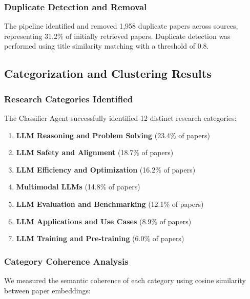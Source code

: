 \subsubsection{Duplicate Detection and Removal}

The pipeline identified and removed 1,958 duplicate papers across sources, representing 31.2\% of initially retrieved papers. Duplicate detection was performed using title similarity matching with a threshold of 0.8.

\subsection{Categorization and Clustering Results}

\subsubsection{Research Categories Identified}

The Classifier Agent successfully identified 12 distinct research categories:

\begin{enumerate}
    \item \textbf{LLM Reasoning and Problem Solving} (23.4\% of papers)
    \item \textbf{LLM Safety and Alignment} (18.7\% of papers)
    \item \textbf{LLM Efficiency and Optimization} (16.2\% of papers)
    \item \textbf{Multimodal LLMs} (14.8\% of papers)
    \item \textbf{LLM Evaluation and Benchmarking} (12.1\% of papers)
    \item \textbf{LLM Applications and Use Cases} (8.9\% of papers)
    \item \textbf{LLM Training and Pre-training} (6.0\% of papers)
\end{enumerate}

\subsubsection{Category Coherence Analysis}

We measured the semantic coherence of each category using cosine similarity between paper embeddings:

